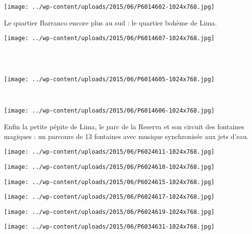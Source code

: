 \begin{center} \texttt{[image: ../wp-content/uploads/2015/06/P6014602-1024x768.jpg]} \end{center}
 \vspace{-\topsep}
 \vspace{-2.75mm}
\pagebreak

Le quartier Barranco encore plus au sud : le quartier bohème de Lima. 

\begin{center} \texttt{[image: ../wp-content/uploads/2015/06/P6014607-1024x768.jpg]} \end{center}
~\\~\\
\begin{center} \texttt{[image: ../wp-content/uploads/2015/06/P6014605-1024x768.jpg]} \end{center}
\vspace{-\topsep}
\pagebreak
~
\begin{center} \texttt{[image: ../wp-content/uploads/2015/06/P6014606-1024x768.jpg]} \end{center}

Enfin la petite pépite de Lima, le parc de la Reserva et son circuit des fontaines magiques : un parcours de 13 fontaines avec musique synchronisée aux jets d'eau. 

\begin{center} \texttt{[image: ../wp-content/uploads/2015/06/P6024611-1024x768.jpg]} \end{center}

\begin{center} \texttt{[image: ../wp-content/uploads/2015/06/P6024610-1024x768.jpg]} \end{center}

\begin{center} \texttt{[image: ../wp-content/uploads/2015/06/P6024615-1024x768.jpg]} \end{center}

\begin{center} \texttt{[image: ../wp-content/uploads/2015/06/P6024617-1024x768.jpg]} \end{center}

\begin{center} \texttt{[image: ../wp-content/uploads/2015/06/P6024619-1024x768.jpg]} \end{center}

\begin{center} \texttt{[image: ../wp-content/uploads/2015/06/P6034631-1024x768.jpg]} \end{center}
